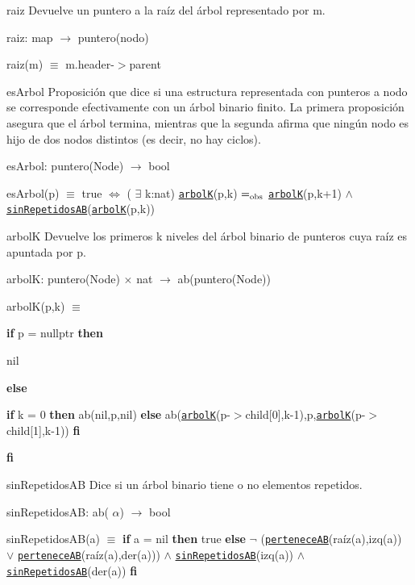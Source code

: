 \begin{DoxyParagraph}{raiz}
Devuelve un puntero a la raíz del árbol representado por m.

raiz\-: map $\to$ puntero(nodo) \par
 raiz(m) $\equiv$ m.\-header-\/$>$parent


\end{DoxyParagraph}
\begin{DoxyParagraph}{es\-Arbol}
Proposición que dice si una estructura representada con punteros a nodo se corresponde efectivamente con un árbol binario finito. La primera proposición asegura que el árbol termina, mientras que la segunda afirma que ningún nodo es hijo de dos nodos distintos (es decir, no hay ciclos).

es\-Arbol\-: puntero(\-Node) $\to$ bool \par
 es\-Arbol(p) $\equiv$ true $\Leftrightarrow$ ( $\exists$ k\-:nat) \href{axiomas.html#arbolK}{\tt arbol\-K}(p,k) $=_{\rm obs}$ \href{axiomas.html#arbolK}{\tt arbol\-K}(p,k+1) $\land$ \href{axiomas.html#sinRepetidosAB}{\tt sin\-Repetidos\-A\-B}(\href{axiomas.html#arbolK}{\tt arbol\-K}(p,k))


\end{DoxyParagraph}
\begin{DoxyParagraph}{arbol\-K}
Devuelve los primeros k niveles del árbol binario de punteros cuya raíz es apuntada por p.

arbol\-K\-: puntero(\-Node) $\times$ nat $\to$ ab(puntero(\-Node)) \par
 arbol\-K(p,k) $\equiv$ \par
 {\bfseries if} p = nullptr {\bfseries then} \par
 nil \par
 {\bfseries else} \par
 {\bfseries if} k = 0 {\bfseries then} ab(nil,p,nil) {\bfseries else} ab(\href{axiomas.html#arbolK}{\tt arbol\-K}(p-\/$>$child\mbox{[}0\mbox{]},k-\/1),p,\href{axiomas.html#arbolK}{\tt arbol\-K}(p-\/$>$child\mbox{[}1\mbox{]},k-\/1)) {\bfseries fi} \par
 {\bfseries fi} 


\end{DoxyParagraph}
\begin{DoxyParagraph}{sin\-Repetidos\-A\-B}
Dice si un árbol binario tiene o no elementos repetidos.

sin\-Repetidos\-A\-B\-: ab( $\alpha$) $\to$ bool \par
 sin\-Repetidos\-A\-B(a) $\equiv$ {\bfseries if} a = nil {\bfseries then} true {\bfseries else} $\lnot$ (\href{axiomas.html#perteneceAB}{\tt pertenece\-A\-B}(raíz(a),izq(a)) $\lor$ \href{axiomas.html#perteneceAB}{\tt pertenece\-A\-B}(raíz(a),der(a))) $\land$ \href{axiomas.html#sinRepetidosAB}{\tt sin\-Repetidos\-A\-B}(izq(a)) $\land$ \href{axiomas.html#sinRepetidosAB}{\tt sin\-Repetidos\-A\-B}(der(a)) {\bfseries fi} 


\end{DoxyParagraph}

